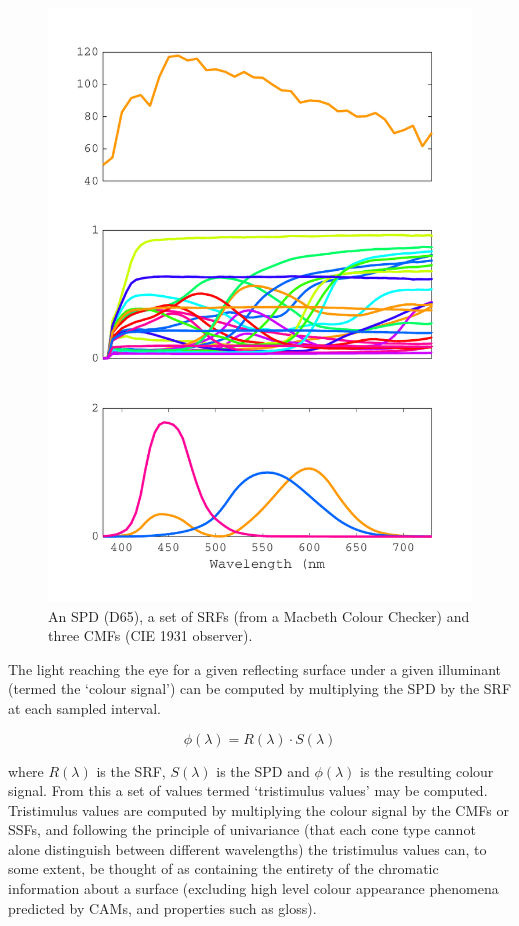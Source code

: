 \begin{figure}[htbp]
\includegraphics[max width=\textwidth]{figs/LitRev/SPDetc.pdf}
\caption{An \gls{SPD} (D65), a set of \glspl{SRF} (from a Macbeth Colour Checker) and three \glspl{CMF} (\gls{CIE} 1931 observer).}
\label{fig:specFun}
\end{figure}

The light reaching the eye for a given reflecting surface under a given illuminant (termed the `colour signal') can be computed by multiplying the \gls{SPD} by the \gls{SRF} at each sampled interval.

\begin{equation}
\phi(\lambda)=R(\lambda) \cdot S(\lambda)
\end{equation}

where $R(\lambda)$ is the \gls{SRF}, $S(\lambda)$ is the \gls{SPD} and $\phi(\lambda)$ is the resulting colour signal. From this a set of values termed `tristimulus values' may be computed. Tristimulus values are computed by multiplying the colour signal by the \glspl{CMF} or \glspl{SSF}, and following the principle of univariance (that each cone type cannot alone distinguish between different wavelengths) the tristimulus values can, to some extent, be thought of as containing the entirety of the chromatic information about a surface (excluding high level colour appearance phenomena predicted by \Glspl{CAM}, and properties such as gloss).

